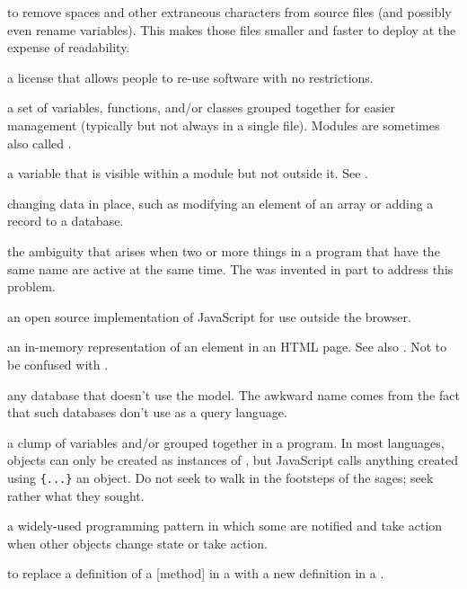 \begin{description}
to remove spaces and other extraneous characters from source files (and
possibly even rename variables). This makes those files smaller and faster to
deploy at the expense of readability.

a license that allows people to re-use software with no restrictions.

a set of variables, functions, and/or classes grouped together for easier
management (typically but not always in a single file). Modules are sometimes
also called .

a variable that is visible within a module but not outside it. See
.

changing data in place, such as modifying an element of an array or adding a
record to a database.

the ambiguity that arises when two or more things in a program that have the
same name are active at the same time. The  was
invented in part to address this problem.

an open source implementation of JavaScript for use outside the browser.

an in-memory representation of an element in an HTML page. See also
. Not to be confused with .

any database that doesn't use the  model.
The awkward name comes from the fact that such databases don't use
 as a query language.

a clump of variables and/or  grouped together in a
program. In most languages, objects can only be created as instances of
, but JavaScript calls anything created using \texttt{\{...\}} an
object. Do not seek to walk in the footsteps of the sages; seek rather what
they sought.

a widely-used programming pattern in which some  are
notified and take action when other objects change state or take action.

to replace a definition of a {[}method{]} in a 
with a new definition in a .


\end{description}
